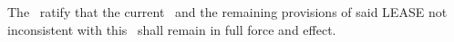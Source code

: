 The \parties\ ratify that the current \lease\ and the remaining provisions of said LEASE not inconsistent with this \amendmentTitle\ shall remain in full force and effect.
